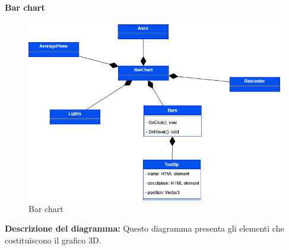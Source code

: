 \paragraph{Bar chart}
\begin{figure}[h!] \centering
    \includegraphics[scale=0.45]{template/images/uml_front/ui/barchart.png}
    \caption{Bar chart}
\end{figure}
\textbf{Descrizione del diagramma:}
Questo diagramma presenta gli elementi che costituiscono il grafico 3D.
